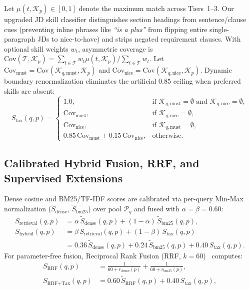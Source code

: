 Let $\mu(t, \mathcal{K}_p) \in [0, 1]$ denote the maximum match across Tiers~1--3. Our upgraded JD skill classifier distinguishes section headings from sentence/clause cues (preventing inline phrases like \textit{``is a plus''} from flipping entire single-paragraph JDs to nice-to-have) and strips negated requirement clauses. With optional skill weights $w_t$, asymmetric coverage is $\text{Cov}(\mathcal{T}, \mathcal{K}_p) = \sum_{t \in \mathcal{T}} w_t \mu(t, \mathcal{K}_p) / \sum_{t \in \mathcal{T}} w_t$. Let $\text{Cov}_{\text{must}} = \text{Cov}(\mathcal{K}_{q,\text{must}}, \mathcal{K}_p)$ and $\text{Cov}_{\text{nice}} = \text{Cov}(\mathcal{K}_{q,\text{nice}}, \mathcal{K}_p)$. Dynamic boundary renormalization eliminates the artificial $0.85$ ceiling when preferred skills are absent:
\begin{equation}
    S_{\text{tax}}(q, p) = \begin{cases}
        1.0, & \text{if } \mathcal{K}_{q,\text{must}} = \emptyset \text{ and } \mathcal{K}_{q,\text{nice}} = \emptyset, \\
        \text{Cov}_{\text{must}}, & \text{if } \mathcal{K}_{q,\text{nice}} = \emptyset, \\
        \text{Cov}_{\text{nice}}, & \text{if } \mathcal{K}_{q,\text{must}} = \emptyset, \\
        0.85\,\text{Cov}_{\text{must}} + 0.15\,\text{Cov}_{\text{nice}}, & \text{otherwise.}
    \end{cases}
    \label{eq:stax_renorm}
\end{equation}

\subsection{Calibrated Hybrid Fusion, RRF, and Supervised Extensions}
Dense cosine and BM25/TF-IDF scores are calibrated via per-query Min-Max normalization ($\tilde{S}_{\text{dense}}$, $\tilde{S}_{\text{bm25}}$) over pool $\mathcal{P}_q$ and fused with $\alpha = \beta = 0.60$:
\begin{equation}
\begin{aligned}
    S_{\text{retrieval}}(q, p) &= \alpha\,\tilde{S}_{\text{dense}}(q, p) + (1 - \alpha)\,\tilde{S}_{\text{bm25}}(q, p), \\
    S_{\text{hybrid}}(q, p) &= \beta\,S_{\text{retrieval}}(q, p) + (1 - \beta)\,S_{\text{tax}}(q, p) \\
    &= 0.36\,\tilde{S}_{\text{dense}}(q, p) + 0.24\,\tilde{S}_{\text{bm25}}(q, p) + 0.40\,S_{\text{tax}}(q, p).
\end{aligned}
\label{eq:hybrid_full}
\end{equation}
For parameter-free fusion, Reciprocal Rank Fusion (RRF, $k=60$)~\cite{cormack2009reciprocal} computes:
\begin{equation}
\begin{aligned}
    S_{\text{RRF}}(q, p) &= \frac{1}{60 + r_{\text{dense}}(p)} + \frac{1}{60 + r_{\text{bm25}}(p)}, \\
    S_{\text{RRF+Tax}}(q, p) &= 0.60\,\tilde{S}_{\text{RRF}}(q, p) + 0.40\,S_{\text{tax}}(q, p),
\end{aligned}
\label{eq:rrf}
\end{equation}

